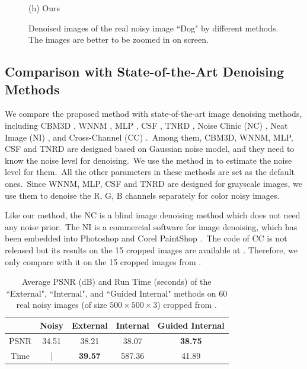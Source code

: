 \documentclass[10pt,twocolumn,letterpaper]{article}
\begin{document}
\begin{figure}
{\begin{minipage}[t]{0.244\textwidth}
{\footnotesize (h) Ours  }
\end{minipage}
}
\vspace{-3mm}
\caption{Denoised images of the real noisy image ``Dog" \cite{ncwebsite} by different methods. The images are better to be zoomed in on screen.}
\label{fig6}
\end{figure}


\subsection{Comparison with State-of-the-Art Denoising Methods}


We compare the proposed method with state-of-the-art image denoising methods, including CBM3D \cite{bm3d,cbm3d}, WNNM \cite{wnnm}, MLP \cite{mlp}, CSF \cite{csf}, TNRD \cite{chen2015learning}, Noise Clinic (NC) \cite{noiseclinic,ncwebsite}, Neat Image (NI) \cite{neatimage}, and Cross-Channel (CC) \cite{crosschannel2016}.\ Among them, CBM3D, WNNM, MLP, CSF and TNRD are designed based on Gaussian noise model, and they need to know the noise level for denoising.\ We use the method in \cite{noiselevel} to estimate the noise level for them.\ All the other parameters in these methods are set as the default ones.\ Since WNNM, MLP, CSF and TNRD are designed for grayscale images, we use them to denoise the R, G, B channels separately for color noisy images. 

Like our method, the NC is a blind image denoising method which does not need any noise prior.\ The NI is a commercial software for image denoising, which has been embedded into Photoshop and Corel PaintShop \cite{neatimage}.\ The code of CC is not released but its results on the 15 cropped images are available at \cite{crosschannel2016}. Therefore, we only compare with it on the 15 cropped images from \cite{crosschannel2016}. 

\begin{table}
\caption{Average PSNR (dB) and Run Time (seconds) of the ``External", ``Internal", and ``Guided Internal" methods on 60 real noisy images (of size $500\times500\times3$) cropped from \cite{crosschannel2016}.}
\label{tab1}
\vspace{-3mm}
\begin{center}
\renewcommand\arraystretch{1}
\begin{tabular}{|c||c|c|c|c|}
\hline
 & \small\textbf{Noisy} &\small \textbf{External} & \small\textbf{Internal} & \small\textbf{Guided Internal}  
\\
\hline
PSNR & 34.51 & 38.21 & 38.07 & \textbf{38.75} 
\\
\hline
Time & | &  \textbf{39.57}  & 587.36 & 41.89
\\
\hline
\end{tabular}
\end{center}\vspace{-2mm}
\end{table}
\end{document}

